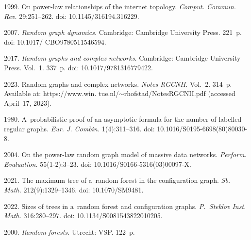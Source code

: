   \begin{multicols}{2}

\renewcommand{\bibname}{\protect\rmfamily References}

{\small\frenchspacing
 {%
 \begin{thebibliography}{9} 
 
 1999. On power-law 
relationships of
the internet topology. \textit{Comput. Commun. Rev.} 29:251--262. 
doi: 10.1145/316194.316229.


 2007. \textit{Random graph dynamics.} Cambridge: Cambridge 
University Press. 221~p. doi: 10.1017/ CBO9780511546594.

 2017. \textit{Random graphs and complex networks.} 
Cambridge:
Cambridge University Press. Vol.~1. 337~p. doi: 10.1017/9781316779422.

 2023. Random graphs and complex networks. \textit{Notes 
RGCNII.} Vol.~2. 314~p.
Available at: {\sf https://www.win. tue.nl/$\sim$rhofstad/NotesRGCNII.pdf} 
(accessed April~17, 2023).


 1980. A~probabilistic proof of an asymptotic formula for 
the number
of labelled regular graphs. \textit{Eur. J. Combin.} 1(4):311--316. 
doi: 10.1016/S0195-6698(80)80030-8.

 2004. On the power-law random graph model 
of massive data
networks. \textit{Perform. Evaluation.} 55(1-2):3--23. doi: 10.1016/S0166-5316(03)00097-X.

 2021. The maximum tree of a~random forest in the 
configuration graph.
\textit{Sb. Math.} 212(9):1329--1346. doi: 10.1070/SM9481.

 2022. Sizes of trees in 
a~random forest and configuration graphs.
\textit{P.~Steklov Inst. Math.} 316:280--297. doi: 10.1134/S0081543822010205.

 2000. \textit{Random forests.} Utrecht: VSP. 122~p.
\end{thebibliography}

 }
 }

\end{multicols}

